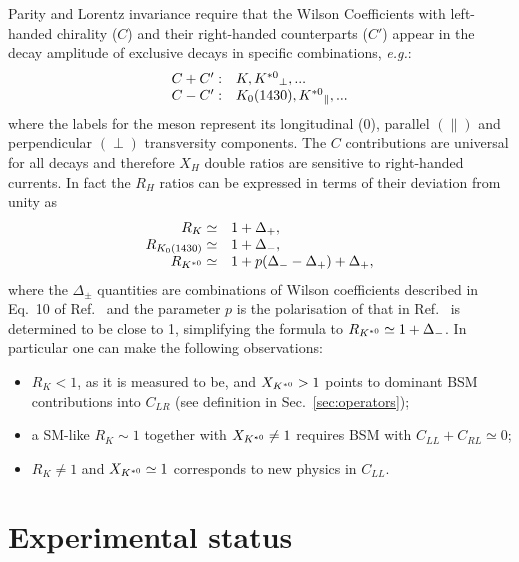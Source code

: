 Parity and Lorentz invariance require that the Wilson Coefficients with left-handed chirality ($C$)
and their right-handed counterparts ($C'$) appear in the decay amplitude of exclusive decays in
specific combinations, \emph{e.g.}:
\begin{equation}
\begin{array}{ll}
C+C': & K, {{K}^{*0}}_{\perp}, ...  \\
C-C': & K_0(1430), {{K}^{*0}}_\parallel, ...
\end{array}
\end{equation}
where the labels for the \Kstarz meson represent its longitudinal (0), parallel $(\parallel)$ and
perpendicular $(\perp)$ transversity components. The $C$ contributions are universal for
all decays and therefore $X_H$ double ratios are sensitive to right-handed currents.
In fact the $R_H$ ratios can be expressed in terms of their deviation from unity as
\begin{equation}
\begin{array}{rl}
R_K \simeq 			& 1+ \Delta_+, 		\\
R_{K_0(1430)} \simeq 	& 1+ \Delta_-,		\\
R_{{{K}^{*0}}} \simeq 		& 1+ p(\Delta_- - \Delta_+) + \Delta_+,
\end{array}
\end{equation}
where the $\Delta_\pm$ quantities are combinations of Wilson coefficients
described in Eq.~10 of Ref.~\cite{Hiller:2014ula} and the parameter $p$ is the polarisation of \Kstarz
that in Ref.~\cite{Hiller:2014ula} is determined to be close to 1, simplifying the formula to $R_{{{K}^{*0}}} \simeq 1+ \Delta_-$.
In particular one can make the following observations: 
\begin{itemize}
\item $R_K < 1$, as it is measured to be, and $X_{{{K}^{*0}}} > 1$ points to dominant BSM contributions into $C_{LR}$ (see definition in Sec.~\ref{sec:operators});
\item a SM-like $R_K \sim 1$ together with $X_{{{K}^{*0}}} \neq 1$ requires BSM with $C_{LL} + C_{RL} \simeq 0$;
\item $R_K \neq 1$ and $X_{{{K}^{*0}}} \simeq 1$ corresponds to new physics in $C_{LL}$.
\end{itemize}

\section{Experimental status}

